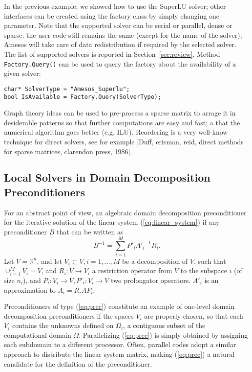 \documentclass[acmtocl]{acmtrans2m}
\begin{document}
In the previous example, we showed how to use the SuperLU solver; other
interfaces
can be created using the factory class by simply changing one parameter. Note
that the supported solver can be serial or parallel, dense or sparse: the user
code still remains the same (except for the name of the solver); Amesos will
take care of data redistribution if required by the selected solver. The list
of supported solvers is reported in Section~\ref{sec:review}.
 Method
\verb!Factory.Query()! can be used to query the factory about the
availability of a given solver:
\begin{verbatim}
char* SolverType = "Amesos_Superlu";
bool IsAvailable = Factory.Query(SolverType);
\end{verbatim}

\bigskip

Graph theory ideas can be used to pre-process a sparse matrix to arrage it in
desiderable patterns so that further computations are easy and fast; a that
the numerical algorithm goes better (e.g. ILU). Reordering is a very well-know
technique for direct solvers, see for example [Duff, erisman, reid, direct
methods for sparse matrices, clarendon press, 1986].

\subsection{Local Solvers in Domain Decomposition Preconditioners}
\label{sec:ifpack}

For an abstract point of view, an algebraic domain decomposition
preconditioner for the iterative solution of the linear system
(\ref{eq:linear_system})
if any preconditioner $B$ that can be written as
\begin{equation}
\label{eq:prec}
B^{-1} = \sum_{i=1}^M P'_i {A'_i}^{-1} R_i.
\end{equation}
Let $V = \mathbb{R}^n$, and
let $V_i \subset V, i = 1, \ldots, M$ be a decomposition of $V$, such that
$\cup_{i=1}^M V_i = V$, and $R_i: V \rightarrow V_i$ a restriction operator
from $V$ to the subspace $i$ (of size $n_i$),
and $P_i: V_i \rightarrow V, P'_i : V_i \rightarrow V$ two prolongator
operators. $A'_i$ is an approximation to $A_i = R_i A P_i$. 

Preconditioners of type (\ref{eq:prec}) constitute an example of one-level
domain decomposition preconditioners if the spaces $V_i$ are properly chosen,
so that each $V_i$ contains the unknowns defined on $\Omega_i$, a contiguous
subset of the computational domain $\Omega$. Parallelizing (\ref{eq:prec})
is simply obtained by assigning each subdomain to a different processor.
Often, parallel codes adopt a similar approach to distribute the linear
system matrix, making (\ref{eq:prec}) a natural candidate for the definition
of the preconditioner.
\end{document}
